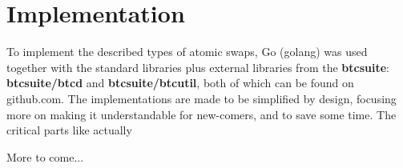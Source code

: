 \chapter{Implementation}
To implement the described types of atomic swaps, Go (golang) was used together with the standard libraries plus external libraries from the \textbf{btcsuite}: \textbf{btcsuite/btcd} and \textbf{btcsuite/btcutil}, both of which can be found on github.com. The implementations are made to be simplified by design, focusing more on making it understandable for new-comers, and to save some time. The critical parts like actually 

\vspace{20mm}
More to come...